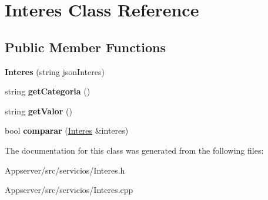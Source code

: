 \hypertarget{classInteres}{}\section{Interes Class Reference}
\label{classInteres}
\subsection*{Public Member Functions}
\begin{DoxyCompactItemize}
\item 
{\bfseries Interes} (string json\+Interes)\hypertarget{classInteres_ac47ad5c9dfdb0c95d9c2af9e6685f585}{}\label{classInteres_ac47ad5c9dfdb0c95d9c2af9e6685f585}

\item 
string {\bfseries get\+Categoria} ()\hypertarget{classInteres_a9118e83aca3b4efd1a17bdfc4d69978c}{}\label{classInteres_a9118e83aca3b4efd1a17bdfc4d69978c}

\item 
string {\bfseries get\+Valor} ()\hypertarget{classInteres_aad0e3700332a4573f82ffacebc8f2158}{}\label{classInteres_aad0e3700332a4573f82ffacebc8f2158}

\item 
bool {\bfseries comparar} (\hyperlink{classInteres}{Interes} \&interes)\hypertarget{classInteres_a50cc2e06e6bd12494e7fd2e56e4a9808}{}\label{classInteres_a50cc2e06e6bd12494e7fd2e56e4a9808}

\end{DoxyCompactItemize}


The documentation for this class was generated from the following files\+:\begin{DoxyCompactItemize}
\item 
Appserver/src/servicios/Interes.\+h\item 
Appserver/src/servicios/Interes.\+cpp\end{DoxyCompactItemize}
